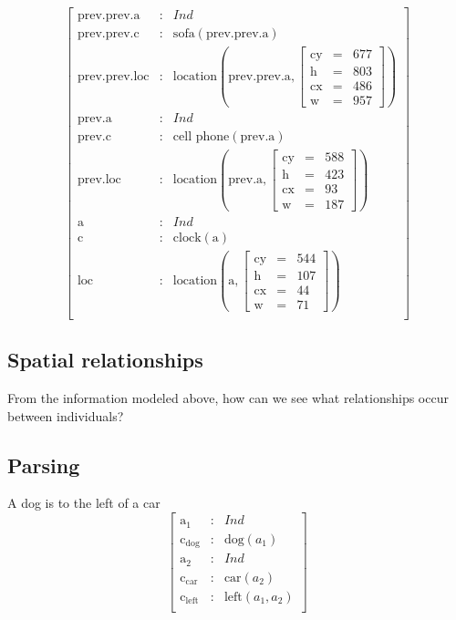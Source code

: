 \documentclass[11pt, a4paper]{article}
\begin{document}
\begin{equation}\label{eq:indmul}
\left[\begin{array}{rcl}
\text{prev.prev.a} &:& Ind\\
\text{prev.prev.c} &:& \text{sofa}(\text{prev.prev.a})\\
\text{prev.prev.loc} &:& \text{location}(\text{prev.prev.a}, \left[\begin{array}{rcl}
\text{cy} &=& 677\\
\text{h} &=& 803\\
\text{cx} &=& 486\\
\text{w} &=& 957
\end{array}\right])\\
\text{prev.a} &:& Ind\\
\text{prev.c} &:& \text{cell phone}(\text{prev.a})\\
\text{prev.loc} &:& \text{location}(\text{prev.a}, \left[\begin{array}{rcl}
\text{cy} &=& 588\\
\text{h} &=& 423\\
\text{cx} &=& 93\\
\text{w} &=& 187
\end{array}\right])\\
\text{a} &:& Ind\\
\text{c} &:& \text{clock}(\text{a})\\
\text{loc} &:& \text{location}(\text{a}, \left[\begin{array}{rcl}
\text{cy} &=& 544\\
\text{h} &=& 107\\
\text{cx} &=& 44\\
\text{w} &=& 71
\end{array}\right])\\
\end{array}\right]\end{equation}

\subsection{Spatial relationships}

From the information modeled above, how can we see what relationships occur between individuals?


\subsection{Parsing}

A dog is to the left of a car
\begin{equation}\left[\begin{array}{rcl}
\text{a}_\text{1} &:& Ind\\
\text{c}_\text{dog} &:& \text{dog}(a_1)\\
\text{a}_\text{2} &:& Ind\\
\text{c}_\text{car} &:& \text{car}(a_2)\\
\text{c}_\text{left} &:& \text{left}(a_1, a_2)\\
\end{array}\right]\end{equation}
\end{document}
